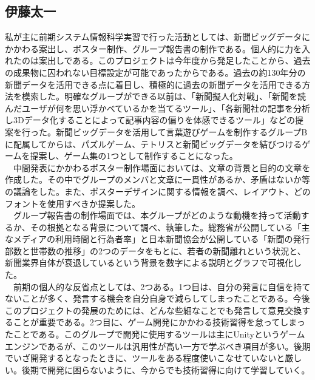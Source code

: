 \subsection{伊藤太一}
私が主に前期システム情報科学実習で行った活動としては、新聞ビッグデータにかかわる案出し、ポスター制作、グループ報告書の制作である。個人的に力を入れたのは案出しである。このプロジェクトは今年度から発足したことから、過去の成果物に囚われない目標設定が可能であったからである。過去の約130年分の新聞データを活用できる点に着目し、積極的に過去の新聞データを活用できる方法を模索した。明確なグループができる以前は、「新聞擬人化対戦」、「新聞を読んだユーザが何を思い浮かべているかを当てるツール」、「各新聞社の記事を分析し3Dデータ化することによって記事内容の偏りを体感できるツール」などの提案を行った。新聞ビッグデータを活用して言葉遊びゲームを制作するグループBに配属してからは、パズルゲーム、テトリスと新聞ビッグデータを結びつけるゲームを提案し、ゲーム集の1つとして制作することになった。\\
　中間発表にかかわるポスター制作場面においては、文章の背景と目的の文章を作成した。その中でグループのメンバと文章に一貫性があるか、矛盾はないか等の議論をした。また、ポスターデザインに関する情報を調べ、レイアウト、どのフォントを使用すべきか提案した。\\
　グループ報告書の制作場面では、本グループがどのような動機を持って活動するか、その根拠となる背景について調べ、執筆した。総務省が公開している「主なメディアの利用時間と行為者率」と日本新聞協会が公開している「新聞の発行部数と世帯数の推移」の2つのデータをもとに、若者の新聞離れという状況と、新聞業界自体が衰退しているという背景を数字による説明とグラフで可視化した。\\
　前期の個人的な反省点としては、2つある。1つ目は、自分の発言に自信を持てないことが多く、発言する機会を自分自身で減らしてしまったことである。今後このプロジェクトの発展のためには、どんな些細なことでも発言して意見交換することが重要である。2つ目に、ゲーム開発にかかわる技術習得を怠ってしまったことである。このグループで開発に使用するツールは主にUnityというゲームエンジンであるが、このツールは汎用性が高い一方で学ぶべき項目が多い。後期でいざ開発するとなったときに、ツールをある程度使いこなせていないと厳しい。後期で開発に困らないように、今からでも技術習得に向けて学習していく。

